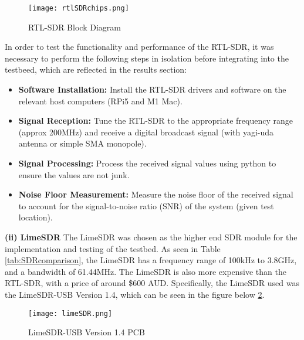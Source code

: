 \begin{figure}[htbp]
    \centering
    \texttt{[image: rtlSDRchips.png]}
    \caption{RTL-SDR Block Diagram \cite{RTLsdrBlockDiagram}}
    \label{fig:rtlSDRblock}
\end{figure}

\par \noindent
In order to test the functionality and performance of the RTL-SDR, it was necessary to perform the following steps in isolation before integrating into the testbeed, which are reflected in the results section:
\begin{itemize}
    \item \textbf{Software Installation:} Install the RTL-SDR drivers and software on the relevant host computers (RPi5 and M1 Mac).
    \item \textbf{Signal Reception:} Tune the RTL-SDR to the appropriate frequency range (approx 200MHz) and receive a digital broadcast signal (with yagi-uda antenna or simple SMA monopole).
    \item \textbf{Signal Processing:} Process the received signal values using python to ensure the values are not junk.
    \item \textbf{Noise Floor Measurement:} Measure the noise floor of the received signal to account for the signal-to-noise ratio (SNR) of the system (given test location).
\end{itemize}

\vspace{0.5cm} \noindent 
\textbf{(ii) LimeSDR}
The LimeSDR was chosen as the higher end SDR module for the implementation and testing of the testbed. As seen in Table \ref{tab:SDRcomparison}, the LimeSDR has a frequency range of 100kHz to 3.8GHz, and a bandwidth of 61.44MHz. The LimeSDR is also more expensive than the RTL-SDR, with a price of around \$600 AUD. Specifically, the LimeSDR used was the LimeSDR-USB Version 1.4, which can be seen in the figure below \ref{fig:limeSDR}. 

\begin{figure}[htbp]
    \centering
    \texttt{[image: limeSDR.png]}
    \caption{LimeSDR-USB Version 1.4 PCB \cite{limesdr_usb}}
    \label{fig:limeSDR}
\end{figure}

